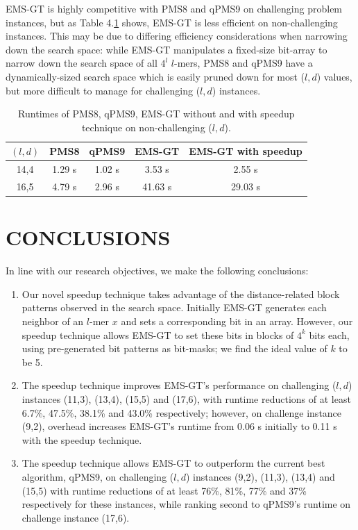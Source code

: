 \documentclass[oneside,12pt]{DISCSthesis}
\begin{document}
{		EMS-GT is highly competitive with PMS8 and qPMS9 on challenging problem instances, but as Table 4.\ref{tbl:runtimes_nonchallenge} shows, EMS-GT is less efficient on non-challenging instances. This may be due to differing efficiency considerations when narrowing down the search space: while EMS-GT manipulates a fixed-size bit-array to narrow down the search space of all $4^l$ $l$-mers, PMS8 and qPMS9 have a dynamically-sized search space which is easily pruned down for most ($l,d$) values, but more difficult to manage for challenging ($l,d$) instances.\\

		\begin{table}[ht] \label{tbl:runtimes_nonchallenge}
			\renewcommand{\arraystretch}{1.3}
			\centering
			\begin{tabular}{|c|c|c|c|c|}
			\hline \bfseries\boldmath $(l,d)$ & \bfseries PMS8 & \bfseries qPMS9 & \bfseries EMS-GT & \bfseries EMS-GT with speedup\\
			\hline
			14,4 &  1.29 s  &  1.02 s &  3.53 s &   2.55 s\\
			16,5 &  4.79 s  &  2.96 s & 41.63 s &  29.03 s\\
			\hline\end{tabular}

			\caption{\small Runtimes of PMS8, qPMS9, EMS-GT without and with speedup technique on non-challenging ($l,d$).}
			\end{table}

\chapter{CONCLUSIONS}
	In line with our research objectives, we make the following conclusions:
	\begin{enumerate}
		\item Our novel speedup technique takes advantage of the distance-related block patterns observed in the search space. Initially EMS-GT generates each neighbor of an $l$-mer $x$ and sets a corresponding bit in an array. However, our speedup technique allows EMS-GT to set these bits in blocks of $4^k$ bits each, using pre-generated bit patterns as bit-masks; we find the ideal value of $k$ to be 5.
		\item The speedup technique improves EMS-GT's performance on challenging ($l,d$) instances (11,3), (13,4), (15,5) and (17,6), with runtime reductions of at least 6.7\%, 47.5\%, 38.1\% and 43.0\% respectively; however, on challenge instance (9,2), overhead increases EMS-GT's runtime from 0.06 s initially to 0.11 s with the speedup technique.
		\item The speedup technique allows EMS-GT to outperform the current best algorithm, qPMS9, on challenging ($l,d$) instances (9,2), (11,3), (13,4) and (15,5) with runtime reductions of at least 76\%, 81\%, 77\% and 37\% respectively for these instances, while ranking second to qPMS9's runtime on challenge instance (17,6).
		\end{enumerate}

}
\end{document}
